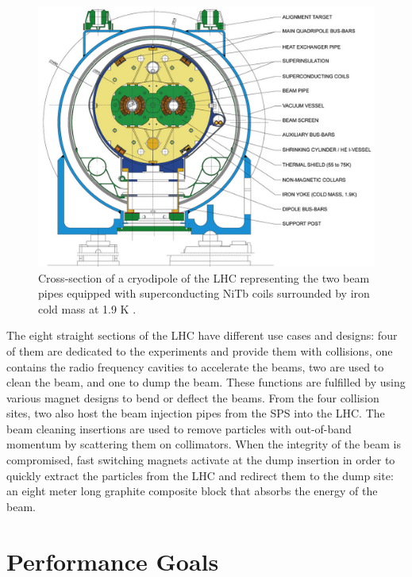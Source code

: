     \begin{figure}[h!]
			\centering
			\includegraphics[width=\textwidth]{img/I-2-LHC/magnet.jpg}
			\caption{Cross-section of a cryodipole of the LHC representing the two beam pipes equipped with superconducting NiTb coils surrounded by iron cold mass at 1.9 K \cite{Evans:2008zzb}.}
			\label{fig:I-2-magnet}
		\end{figure}

    The eight straight sections of the LHC have different use cases and designs: four of them are dedicated to the experiments and provide them with collisions, one contains the radio frequency cavities to accelerate the beams, two are used to clean the beam, and one to dump the beam. These functions are fulfilled by using various magnet designs to bend or deflect the beams. From the four collision sites, two also host the beam injection pipes from the SPS into the LHC. The beam cleaning insertions are used to remove particles with out-of-band momentum by scattering them on collimators. When the integrity of the beam is compromised, fast switching magnets activate at the dump insertion in order to quickly extract the particles from the LHC and redirect them to the dump site: an eight meter long graphite composite block that absorbs the energy of the beam.

	\section{Performance Goals}

